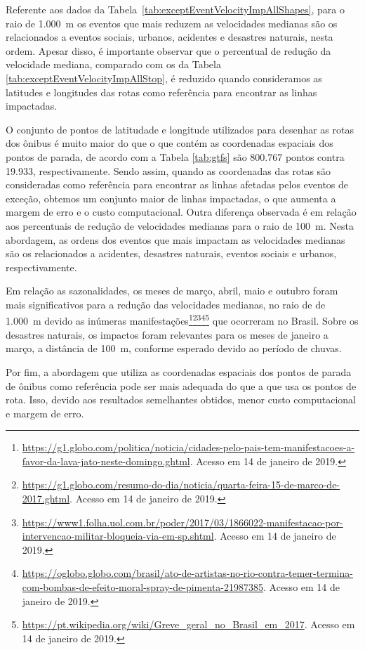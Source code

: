 \documentclass[
	12pt,				%
	oneside,			%
	a4paper,			%
	english,			%
	brazil				%
	]{abntex2ppgsi}
\begin{document}
{{{Referente aos dados da Tabela~\ref{tab:exceptEventVelocityImpAllShapes}, para o raio de 1.000~m os eventos que mais reduzem as velocidades medianas são os relacionados a eventos sociais, urbanos, acidentes e desastres naturais, nesta ordem. Apesar disso, é importante observar que o percentual de redução da velocidade mediana, comparado com os da Tabela \ref{tab:exceptEventVelocityImpAllStop}, é reduzido quando consideramos as latitudes e longitudes das rotas como referência para encontrar as linhas impactadas. 

O conjunto de pontos de latitudade e longitude utilizados para desenhar as rotas dos ônibus é muito maior do que o que contém as coordenadas espaciais dos pontos de parada, de acordo com a Tabela \ref{tab:gtfs} são 800.767 pontos contra 19.933, respectivamente. Sendo assim, quando as coordenadas das rotas são consideradas como referência para encontrar as linhas afetadas pelos eventos de exceção, obtemos um conjunto maior de linhas impactadas, o que aumenta a margem de erro e o custo computacional. Outra diferença observada é em relação aos percentuais de redução de velocidades medianas para o raio de 100~m. Nesta abordagem, as ordens dos eventos que mais impactam as velocidades medianas são os relacionados a acidentes, desastres naturais, eventos sociais e urbanos, respectivamente.

Em relação as sazonalidades, os meses de  março, abril, maio e outubro foram mais significativos para a redução das velocidades medianas, no raio de de 1.000~m devido as inúmeras manifestações\footnote{\url{https://g1.globo.com/politica/noticia/cidades-pelo-pais-tem-manifestacoes-a-favor-da-lava-jato-neste-domingo.ghtml}. Acesso em 14 de janeiro de 2019.}\footnote{\url{https://g1.globo.com/resumo-do-dia/noticia/quarta-feira-15-de-marco-de-2017.ghtml}. Acesso em 14 de janeiro de 2019.}\footnote{\url{https://www1.folha.uol.com.br/poder/2017/03/1866022-manifestacao-por-intervencao-militar-bloqueia-via-em-sp.shtml}. Acesso em 14 de janeiro de 2019.}\footnote{\url{https://oglobo.globo.com/brasil/ato-de-artistas-no-rio-contra-temer-termina-com-bombas-de-efeito-moral-spray-de-pimenta-21987385}. Acesso em 14 de janeiro de 2019.}\footnote{\url{https://pt.wikipedia.org/wiki/Greve\_geral\_no\_Brasil\_em\_2017}. Acesso em 14 de janeiro de 2019.} que ocorreram no Brasil. Sobre os desastres naturais, os impactos foram relevantes para os meses de janeiro a março, a distância de 100~m, conforme esperado devido ao período de chuvas.

Por fim, a abordagem que utiliza as coordenadas espaciais dos pontos de parada de ônibus como referência pode ser mais adequada do que a que usa os pontos de rota. Isso, devido aos resultados semelhantes obtidos, menor custo computacional e margem de erro.  

}}}
\end{document}
